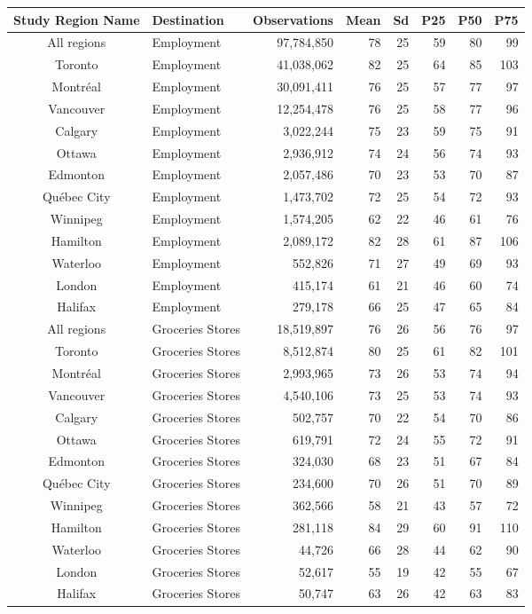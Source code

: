 \documentclass[Royal,times,sageh]{sagej}
\begin{document}
\begingroup
\setlength{}
\setlength{}\fontsize{7.5pt}{9.0pt}\selectfont
\begin{longtable}{@{\extracolsep{\fill}}clrrrrrr}
\toprule
Study Region Name & Destination & Observations & Mean & Sd & P25 & P50 & P75 \\ 
\midrule\addlinespace[2.5pt]
All regions & Employment & 97,784,850 & 78 & 25 & 59 & 80 & 99 \\ 
Toronto & Employment & 41,038,062 & 82 & 25 & 64 & 85 & 103 \\ 
Montréal & Employment & 30,091,411 & 76 & 25 & 57 & 77 & 97 \\ 
Vancouver & Employment & 12,254,478 & 76 & 25 & 58 & 77 & 96 \\ 
Calgary & Employment & 3,022,244 & 75 & 23 & 59 & 75 & 91 \\ 
Ottawa & Employment & 2,936,912 & 74 & 24 & 56 & 74 & 93 \\ 
Edmonton & Employment & 2,057,486 & 70 & 23 & 53 & 70 & 87 \\ 
Québec City & Employment & 1,473,702 & 72 & 25 & 54 & 72 & 93 \\ 
Winnipeg & Employment & 1,574,205 & 62 & 22 & 46 & 61 & 76 \\ 
Hamilton & Employment & 2,089,172 & 82 & 28 & 61 & 87 & 106 \\ 
Waterloo & Employment & 552,826 & 71 & 27 & 49 & 69 & 93 \\ 
London & Employment & 415,174 & 61 & 21 & 46 & 60 & 74 \\ 
Halifax & Employment & 279,178 & 66 & 25 & 47 & 65 & 84 \\ 
All regions & Groceries Stores & 18,519,897 & 76 & 26 & 56 & 76 & 97 \\ 
Toronto & Groceries Stores & 8,512,874 & 80 & 25 & 61 & 82 & 101 \\ 
Montréal & Groceries Stores & 2,993,965 & 73 & 26 & 53 & 74 & 94 \\ 
Vancouver & Groceries Stores & 4,540,106 & 73 & 25 & 53 & 74 & 93 \\ 
Calgary & Groceries Stores & 502,757 & 70 & 22 & 54 & 70 & 86 \\ 
Ottawa & Groceries Stores & 619,791 & 72 & 24 & 55 & 72 & 91 \\ 
Edmonton & Groceries Stores & 324,030 & 68 & 23 & 51 & 67 & 84 \\ 
Québec City & Groceries Stores & 234,600 & 70 & 26 & 51 & 70 & 89 \\ 
Winnipeg & Groceries Stores & 362,566 & 58 & 21 & 43 & 57 & 72 \\ 
Hamilton & Groceries Stores & 281,118 & 84 & 29 & 60 & 91 & 110 \\ 
Waterloo & Groceries Stores & 44,726 & 66 & 28 & 44 & 62 & 90 \\ 
London & Groceries Stores & 52,617 & 55 & 19 & 42 & 55 & 67 \\ 
Halifax & Groceries Stores & 50,747 & 63 & 26 & 42 & 63 & 83 \\ 
\bottomrule
\end{longtable}
\endgroup
\end{document}

